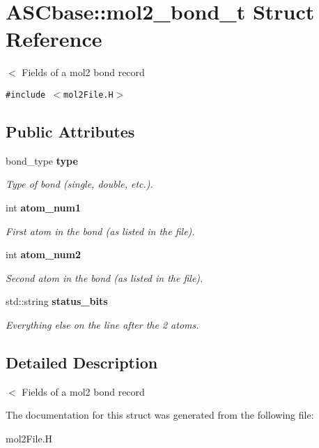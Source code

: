 \section{ASCbase::mol2\_\-bond\_\-t Struct Reference}
\label{structASCbase_1_1mol2__bond__t}
$<$ Fields of a mol2 bond record  


{\tt \#include $<$mol2File.H$>$}

\subsection*{Public Attributes}
\begin{CompactItemize}
\item 
bond\_\-type \bf{type}\label{structASCbase_1_1mol2__bond__t_777a617664920a145b9140c075474cdb}

\begin{CompactList}\small\item\em Type of bond (single, double, etc.). \item\end{CompactList}\item 
int \bf{atom\_\-num1}\label{structASCbase_1_1mol2__bond__t_aec7cb5b3bf6df2d4366f5368df5aef1}

\begin{CompactList}\small\item\em First atom in the bond (as listed in the file). \item\end{CompactList}\item 
int \bf{atom\_\-num2}\label{structASCbase_1_1mol2__bond__t_27316559fbc429818786482aa159c1e1}

\begin{CompactList}\small\item\em Second atom in the bond (as listed in the file). \item\end{CompactList}\item 
std::string \bf{status\_\-bits}\label{structASCbase_1_1mol2__bond__t_435f1fb617a87b857af38482c60cfa4e}

\begin{CompactList}\small\item\em Everything else on the line after the 2 atoms. \item\end{CompactList}\end{CompactItemize}


\subsection{Detailed Description}
$<$ Fields of a mol2 bond record 



The documentation for this struct was generated from the following file:\begin{CompactItemize}
\item 
mol2File.H\end{CompactItemize}
